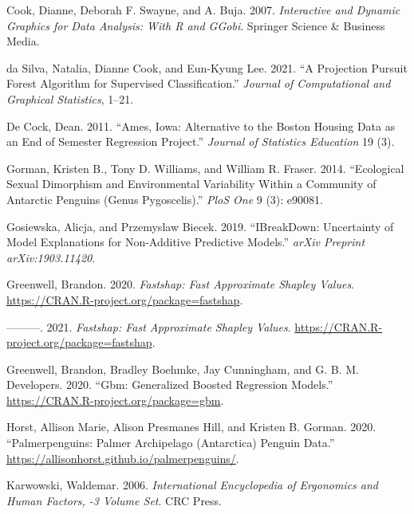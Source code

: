 \documentclass[
]{article}
\newlength{\cslhangindent}
\newlength{\cslentryspacingunit} %
\newenvironment{CSLReferences}[2] %
 {%
  \setlength{\parindent}{0pt}
  \ifodd #1
  \let\oldpar\par
  \def\par{\hangindent=\cslhangindent\oldpar}
  \fi
  \setlength{\parskip}{#2\cslentryspacingunit}
 }%
 {}
\begin{document}
\begin{CSLReferences}{1}{0}
\leavevmode{}%
Cook, Dianne, Deborah F. Swayne, and A. Buja. 2007. \emph{Interactive and {Dynamic} {Graphics} for {Data} {Analysis}: {With} {R} and {GGobi}}. Springer Science \& Business Media.

\leavevmode{}%
da Silva, Natalia, Dianne Cook, and Eun-Kyung Lee. 2021. {``A {Projection} {Pursuit} {Forest} {Algorithm} for {Supervised} {Classification}.''} \emph{Journal of Computational and Graphical Statistics}, 1--21.

\leavevmode{}%
De Cock, Dean. 2011. {``Ames, {Iowa}: {Alternative} to the {Boston} Housing Data as an End of Semester Regression Project.''} \emph{Journal of Statistics Education} 19 (3).

\leavevmode{}%
Gorman, Kristen B., Tony D. Williams, and William R. Fraser. 2014. {``Ecological Sexual Dimorphism and Environmental Variability Within a Community of {Antarctic} Penguins (Genus {Pygoscelis}).''} \emph{PloS One} 9 (3): e90081.

\leavevmode{}%
Gosiewska, Alicja, and Przemyslaw Biecek. 2019. {``{IBreakDown}: {Uncertainty} of Model Explanations for Non-Additive Predictive Models.''} \emph{arXiv Preprint arXiv:1903.11420}.

\leavevmode{}%
Greenwell, Brandon. 2020. \emph{Fastshap: {Fast} {Approximate} {Shapley} {Values}}. \url{https://CRAN.R-project.org/package=fastshap}.

\leavevmode{}%
---------. 2021. \emph{Fastshap: Fast Approximate Shapley Values}. \url{https://CRAN.R-project.org/package=fastshap}.

\leavevmode{}%
Greenwell, Brandon, Bradley Boehmke, Jay Cunningham, and G. B. M. Developers. 2020. {``Gbm: {Generalized} {Boosted} {Regression} {Models}.''} \url{https://CRAN.R-project.org/package=gbm}.

\leavevmode{}%
Horst, Allison Marie, Alison Presmanes Hill, and Kristen B. Gorman. 2020. {``Palmerpenguins: {Palmer} {Archipelago} ({Antarctica}) Penguin Data.''} \url{https://allisonhorst.github.io/palmerpenguins/}.

\leavevmode{}%
Karwowski, Waldemar. 2006. \emph{International {Encyclopedia} of {Ergonomics} and {Human} {Factors}, -3 {Volume} {Set}}. CRC Press.


\end{CSLReferences}
\end{document}
